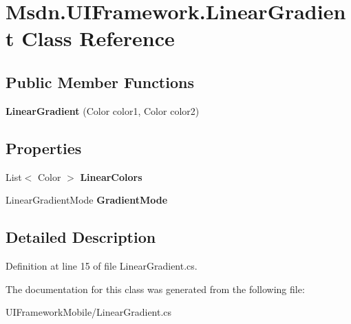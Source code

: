 \hypertarget{class_msdn_1_1_u_i_framework_1_1_linear_gradient}{
\section{Msdn.UIFramework.LinearGradient Class Reference}
\label{class_msdn_1_1_u_i_framework_1_1_linear_gradient}
}
\subsection*{Public Member Functions}
\begin{DoxyCompactItemize}
\item 
\hypertarget{class_msdn_1_1_u_i_framework_1_1_linear_gradient_a5e61ccf82d979d6b2cc850b38fedae77}{
{\bfseries LinearGradient} (Color color1, Color color2)}
\label{class_msdn_1_1_u_i_framework_1_1_linear_gradient_a5e61ccf82d979d6b2cc850b38fedae77}

\end{DoxyCompactItemize}
\subsection*{Properties}
\begin{DoxyCompactItemize}
\item 
\hypertarget{class_msdn_1_1_u_i_framework_1_1_linear_gradient_ae5a7f469a0817b45d9716aed324913c7}{
List$<$ Color $>$ {\bfseries LinearColors}}
\label{class_msdn_1_1_u_i_framework_1_1_linear_gradient_ae5a7f469a0817b45d9716aed324913c7}

\item 
\hypertarget{class_msdn_1_1_u_i_framework_1_1_linear_gradient_a8f9c9749144b296c9ffec46dd16b7d1e}{
LinearGradientMode {\bfseries GradientMode}}
\label{class_msdn_1_1_u_i_framework_1_1_linear_gradient_a8f9c9749144b296c9ffec46dd16b7d1e}

\end{DoxyCompactItemize}


\subsection{Detailed Description}


Definition at line 15 of file LinearGradient.cs.

The documentation for this class was generated from the following file:\begin{DoxyCompactItemize}
\item 
UIFrameworkMobile/LinearGradient.cs\end{DoxyCompactItemize}
